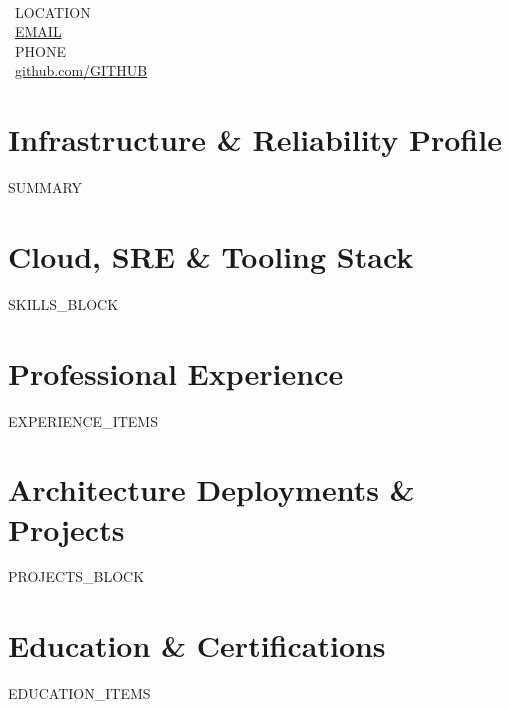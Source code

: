 \documentclass[10pt,letterpaper]{article}
\begin{document}
\begin{minipage}[c]{0.65\textwidth}
  {\LARGE \textbf{}} \\[3pt]
  {\small \textbf{}}
\end{minipage}
\hfill
\begin{minipage}[c]{0.33\textwidth}
  \raggedleft \small
  \faMapPin \ {{LOCATION}} \\
  \faEnvelope \ \href{mailto:{{EMAIL}}}{{{EMAIL}}} \\
  \faPhone \ {{PHONE}} \\
  \faCloud \ \href{https://{{GITHUB}}}{github.com/{{GITHUB}}}
\end{minipage}

\vspace{6pt}

\section{Infrastructure \& Reliability Profile}
\small
{{SUMMARY}}

\section{Cloud, SRE \& Tooling Stack}
\small
{{SKILLS_BLOCK}}

\section{Professional Experience}
\small
{{EXPERIENCE_ITEMS}}

\section{Architecture Deployments \& Projects}
\small
{{PROJECTS_BLOCK}}

\section{Education \& Certifications}
\small
{{EDUCATION_ITEMS}}
\end{document}
